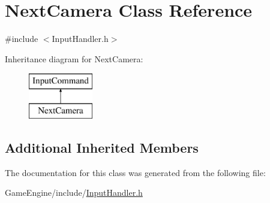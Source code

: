 \hypertarget{class_next_camera}{}\section{Next\+Camera Class Reference}
\label{class_next_camera}


{\ttfamily \#include $<$Input\+Handler.\+h$>$}

Inheritance diagram for Next\+Camera\+:\begin{figure}[H]
\begin{center}
\leavevmode
\includegraphics[height=2.000000cm]{class_next_camera}
\end{center}
\end{figure}
\subsection*{Additional Inherited Members}


The documentation for this class was generated from the following file\+:\begin{DoxyCompactItemize}
\item 
Game\+Engine/include/\mbox{\hyperlink{_input_handler_8h}{Input\+Handler.\+h}}\end{DoxyCompactItemize}
